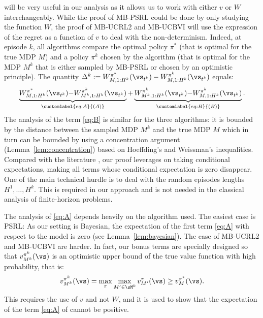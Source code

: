  will be very useful in our analysis as it allows us to work with either $v$ or $W$ interchangeably. While the proof of MB-PSRL could be done by only studying the function $W$, the proof of MB-UCRL2 and MB-UCBVI will use the expression of the regret as a function of $v$ to deal with the non-determinism. Indeed, at episode $k$, all algorithms compare the optimal policy $\pi^*$ (that is optimal for the true MDP $M$) and a policy $\pi^k$ chosen by the algorithm (that is optimal for the MDP $M^k$ that is either sampled by MB-PSRL or chosen by an optimistic principle).  The quantity $\Delta^k := W_{M,1:H^k}^{\pi^*}(\vs_{t^k}) - W_{M,1:H^k}^{\pi^k}(\vs_{t^k})$ equals:
\begin{align}
    \underbrace{W_{M,1:H^k}^{\pi^*}(\vs_{t^k}) {-} W_{M^k,1:H^k}^{\pi^k}(\vs_{t^k})}_{\customlabel{eq:A}{(A)}}%
    + \underbrace{W_{M^k,1:H^k}^{\pi^k}(\vs_{t^k}) {-} W_{M,1:H^k}^{\pi^k}(\vs_{t^k})}_{\customlabel{eq:B}{(B)}}.
    \label{eq:proofAB}%
\end{align}
The analysis of the term \ref{eq:B} is similar for the three algorithms: it is bounded by the distance between the sampled MDP $M^k$ and the true MDP $M$ which in turn can be bounded by using a concentration argument (Lemma~\ref{lem:concentration}) based on Hoeffding's and Weissman's inequalities.  Compared with the literature \cite{azar2017minimax,ouyang2017learning}, our proof leverages on taking conditional expectations, making all terms whose conditional expectation is zero disappear. One of the main technical hurdle is to deal with the random episodes lengths $H^1,\ldots, H^k$.   This is required in our approach and is not needed in the classical analysis of finite-horizon problems.

The analysis of \ref{eq:A} depends heavily on the algorithm used. The easiest case is PSRL: As our setting is Bayesian, the expectation of the first term \ref{eq:A} with respect to the model is zero (see Lemma~\ref{lem:bayesian}).   The case of MB-UCRL2 and MB-UCBVI are harder. In fact, our bonus terms are specially designed so that $v_{M^k}^{\pi^k}(\vs)$ is an optimistic upper bound of the true value function with high probability, that is:
\begin{align}
    \label{eq:optimism}
    v_{M^k}^{\pi^k}(\vs) = \max_{\pi} \max_{M'\in\sM^k} v_{M'}^{\pi}(\vs) \ge v_M^{\pi^*}(\vs).
\end{align}
This requires the use of $v$ and not $W$, and it is used to show that the expectation of the term \ref{eq:A} of  cannot be positive. 

